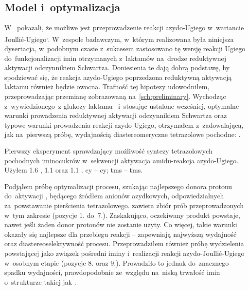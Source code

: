 \subsection{Model i~optymalizacja}
W~\citeyear{nenajdenko13} \citeauthor{nenajdenko13} pokazali, że możliwe jest przeprowadzenie
  reakcji azydo-Ugiego w~wariancie Joulli{\'e}-Ugiego\textsuperscript{,\thinspace}.
W~zespole badawczym, w~którym realizowana była niniejsza dysertacja, w~podobnym czasie
  z~sukcesem zastosowano tę wersję reakcji Ugiego do~funkcjonalizacji imin otrzymanych
  z~laktamów na~drodze reduktywnej aktywacji odczynnikiem Schwartza.
Doniesienia te dają dobrą podstawę, by spodziewać się, że reakcja azydo-Ugiego poprzedzona
  reduktywną aktywacją laktamu również będzie owocna.
Trafność tej hipotezy udowodniłem, przeprowadzając przemianę zobrazowaną na~\cref{sch:preliminary}.
Wychodząc z~wywiedzionego~z glukozy laktamu~ i~stosując ustalone wcześniej,
  optymalne warunki prowadzenia reduktywnej aktywacji odczynnikiem Schwartza
  oraz typowe warunki prowadzenia reakcji azydo-Ugiego,
  otrzymałem z~zadowalającą, jak na~pierwszą próbę, wydajnością diastereomeryczne tetrazolowe
  pochodne: .
\begin{scheme*}
  
  \caption{
    Pierwszy eksperyment sprawdzający możliwość syntezy tetrazolowych pochodnych iminocukrów
      w~sekwencji aktywacja amidu\--reakcja azydo-Ugiego.
    Użyłem \SI{1.6}{\equiv} \schwartz{}, \SI{1.1}{\equiv}  oraz
      \SI{1.1}{\equiv} .
    \acrshort{cy} \--- \acrlong{cy}; \acrshort{tms} \--- \acrlong{tms}.
  }
  \label{sch:preliminary}
\end{scheme*}

Podjąłem próbę optymalizacji procesu, szukając najlepszego donora protonu do~aktywacji ,
  będącego źródłem anionów azydkowych, odpowiedzialnych za~powstawanie pierścienia tetrazolowego.
 zawiera zbiór prób przeprowadzonych w~tym zakresie (pozycje 1. do~7.).
Zaskakująco, oczekiwany produkt powstaje, nawet jeśli żaden donor protonów nie zostanie użyty.
Co więcej, takie warunki okazały się najlepsze dla przebiegu reakcji \--- zapewniają najwyższą
  wydajność oraz diastereoselektywność procesu.
Przeprowadziłem również próbę wydzielenia powstającej jako związek pośredni iminy i~realizacji
  reakcji azydo-Joulli{\'e}-Ugiego w~osobnym etapie (pozycje 8. oraz 9.).
Prowadziło to jednak do~znacznego spadku wydajności, prawdopodobnie ze~względu na~niską trwałość
  imin o~strukturze takiej jak .

